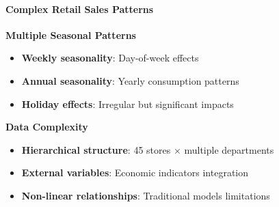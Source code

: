 %
%
%


{
	\framesubtitle{Complex Retail Sales Patterns}
	
	\begin{figure}[H]
		\centering
		
	\end{figure}
	
	\textbf{Multiple Seasonal Patterns}
	\begin{itemize}
		\item \textbf{Weekly seasonality}: Day-of-week effects
		\item \textbf{Annual seasonality}: Yearly consumption patterns
		\item \textbf{Holiday effects}: Irregular but significant impacts \cite{McElroy:2018}
	\end{itemize}
	
	\textbf{Data Complexity}
	\begin{itemize}
		\item \textbf{Hierarchical structure}: 45 stores × multiple departments
		\item \textbf{External variables}: Economic indicators integration
		\item \textbf{Non-linear relationships}: Traditional models limitations \cite{Pao:2017}
	\end{itemize}
}


